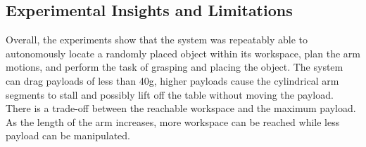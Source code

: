 \subsection{Experimental Insights and Limitations}
Overall, the experiments show that the system was repeatably able to autonomously locate a randomly placed object within its workspace, plan the arm motions, and perform the task of grasping and placing the object.
The system can drag payloads of less than 40\unit{g}, higher payloads cause the cylindrical arm segments to stall and possibly lift off the table without moving the payload.
There is a trade-off between the reachable workspace and the maximum payload.
As the length of the arm increases, more workspace can be reached while less payload can be manipulated. 
